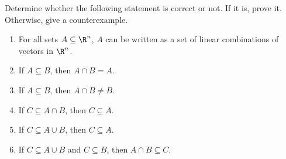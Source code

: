\begin{exercises}
\begin{problist}
		    \prob 
		    Determine whether the following statement is correct or not. If it is, prove it. Otherwise, give a counterexample.
		    \begin{enumerate}
		        \item For all sets $A \subseteq \R^n$, $A$ can be written as a set of linear combinations of vectors in $\R^n$.
		        \item If $A \subseteq B$, then $A \cap B = A$.
		        \item If $A \subseteq B$, then $A \cap B \neq B$.
		        \item If $C \subseteq A \cap B$, then $C \subseteq A$.
		        \item If $C \subseteq A \cup B$, then $C \subseteq A$.
		        \item If $C \subseteq A \cup B$ and $C \subseteq B$, then $A \cap B \subseteq C$.
		    \end{enumerate}
		
	\end{problist}
\end{exercises}
